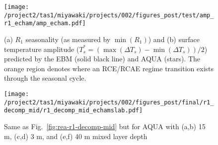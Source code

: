 \documentclass{ametsocV5}
\begin{document}
\begin{figure}
  \noindent\texttt{[image: /project2/tas1/miyawaki/projects/002/figures\_post/test/amp\_r1\_echam/amp\_echam.pdf]}\\
  \caption{(a) $R_1$ seasonality (as measured by $\min(R_1)$) and (b) surface temperature amplitude ($T_s^*=(\max(\Delta T_s)- \min(\Delta T_s))/2$) predicted by the EBM (solid black line) and AQUA (stars). The orange region denotes where an RCE/RCAE regime transition exists through the seasonal cycle.}
  \label{fig:amp-r1-echam}
\end{figure}

\begin{figure}[t]
    \noindent\texttt{[image: /project2/tas1/miyawaki/projects/002/figures\_post/final/r1\_decomp\_mid/r1\_decomp\_mid\_echamslab.pdf]}\\
    \caption{Same as Fig.~\ref{fig:rea-r1-decomp-mid} but for AQUA with (a,b) 15 m, (c,d) 3 m, and (e,f) 40 m mixed layer depth}
\label{fig:echam-rce}
\end{figure}
\end{document}
